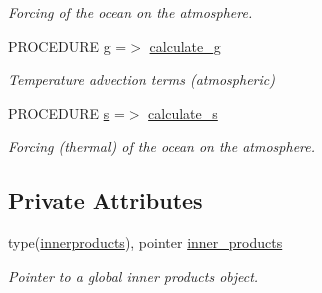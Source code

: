 \begin{DoxyCompactItemize}
\begin{DoxyCompactList}\small\item\em Forcing of the ocean on the atmosphere. \end{DoxyCompactList}\item 
\mbox{\label{structinprod__analytic_1_1atmosphereinnerproducts_ab759d8383f4b395329f0668d04211bde}} 
P\+R\+O\+C\+E\+D\+U\+RE \hyperlink{structinprod__analytic_1_1atmosphereinnerproducts_ab759d8383f4b395329f0668d04211bde}{g} =$>$ \hyperlink{namespaceinprod__analytic_ae90415e2fe9f94483e4b353afc11d245}{calculate\+\_\+g}
\begin{DoxyCompactList}\small\item\em Temperature advection terms (atmospheric) \end{DoxyCompactList}\item 
\mbox{\label{structinprod__analytic_1_1atmosphereinnerproducts_af503c3d4a1b4234dad7d31141b5017af}} 
P\+R\+O\+C\+E\+D\+U\+RE \hyperlink{structinprod__analytic_1_1atmosphereinnerproducts_af503c3d4a1b4234dad7d31141b5017af}{s} =$>$ \hyperlink{namespaceinprod__analytic_a3ca3072c7041b05f960b841dbcc51979}{calculate\+\_\+s}
\begin{DoxyCompactList}\small\item\em Forcing (thermal) of the ocean on the atmosphere. \end{DoxyCompactList}\end{DoxyCompactItemize}
\subsection*{Private Attributes}
\begin{DoxyCompactItemize}
\item 
\mbox{\label{structinprod__analytic_1_1atmosphereinnerproducts_acfba9f7e96f6cb71d932ed0f2bbf24ac}} 
type(\hyperlink{structinprod__analytic_1_1innerproducts}{innerproducts}), pointer \hyperlink{structinprod__analytic_1_1atmosphereinnerproducts_acfba9f7e96f6cb71d932ed0f2bbf24ac}{inner\+\_\+products}
\begin{DoxyCompactList}\small\item\em Pointer to a global inner products object. \end{DoxyCompactList}\end{DoxyCompactItemize}


